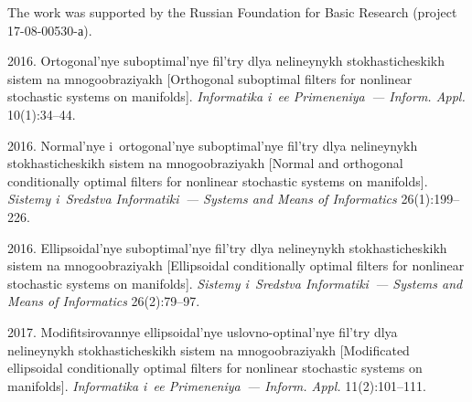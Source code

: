




\vspace*{-15pt}

\Ack
\noindent
The work was supported by the Russian Foundation for Basic Research 
(project 17-08-00530-а).




  \begin{multicols}{2}

\renewcommand{\bibname}{\protect\rmfamily References}

{\small\frenchspacing
 {%
 \begin{thebibliography}{99}

\vspace*{-3pt}

 2016. Ortogonal'nye suboptimal'nye fil'try dlya 
nelineynykh stokhasticheskikh sistem na mno\-go\-ob\-ra\-zi\-yakh 
[Orthogonal suboptimal filters for nonlinear stochastic systems on manifolds]. 
\textit{Informatika i~ee Primeneniya~--- Inform. Appl.} 10(1):34--44.

 2016. Normal'nye i~ortogonal'nye suboptimal'nye 
fil'try dlya nelineynykh stokhasticheskikh sistem na mnogoobraziyakh 
[Normal and orthogonal conditionally optimal filters for nonlinear 
stochastic systems on manifolds]. \textit{Sistemy i~Sredstva Informatiki~--- 
Systems and Means of Informatics} 26(1):199--226.

2016. Ellipsoidal'nye suboptimal'nye fil'try dlya nelineynykh stokhasticheskikh 
sistem na mnogoobraziyakh [Ellipsoidal conditionally optimal filters for 
nonlinear stochastic systems on manifolds]. \textit{Sistemy i~Sredstva Informatiki~--- 
Systems and Means of Informatics} 26(2):79--97.

 2017. 
Modifitsirovannye ellipsoidal'nye uslovno-optinal'nye fil'try dlya
nelineynykh stokhasticheskikh sistem na mnogoobraziyakh
[Modificated ellipsoidal conditionally optimal filters for nonlinear 
stochastic systems on manifolds]. 
\textit{Informatika i~ee Primeneniya~--- Inform. Appl.} 11(2):101--111.


\end{thebibliography}}}
\end{multicols}

